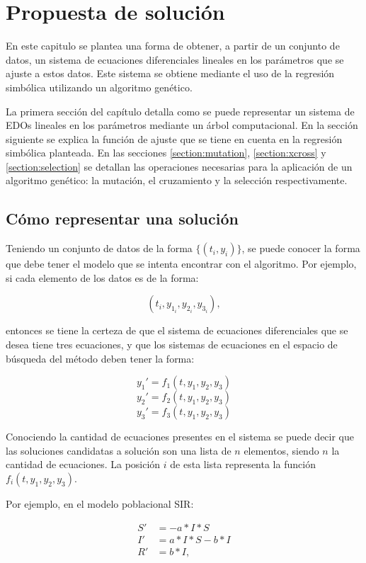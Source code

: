 \chapter{Propuesta de solución}\label{chapter:solution_proposal}

En este capitulo se plantea una forma de obtener, a partir de un conjunto de datos, un sistema de ecuaciones diferenciales lineales en los parámetros que se ajuste a estos datos. Este sistema se obtiene mediante el uso de la regresión simbólica utilizando un algoritmo genético.

La primera sección del capítulo detalla como se puede representar un sistema de EDOs lineales en los parámetros mediante un árbol computacional. En la sección siguiente se explica la función de ajuste que se tiene en cuenta en la regresión simbólica planteada. En las secciones \ref{section:mutation}, \ref{section:xcross} y \ref{section:selection} se detallan las operaciones necesarias para la aplicación de un algoritmo genético: la mutación, el cruzamiento y la selección respectivamente.

\section{Cómo representar una solución}

Teniendo un conjunto de datos de la forma $\{(t_i, y_i)\}$, se puede conocer la forma que debe tener el modelo que se intenta encontrar con el algoritmo. Por ejemplo, si cada elemento de los datos es de la forma:

$$(t_i, y_{1_i}, y_{2_i}, y_{3_i}),$$

entonces se tiene la certeza de que el sistema de ecuaciones diferenciales que se desea tiene tres ecuaciones, y que los sistemas de ecuaciones en el espacio de búsqueda del método deben tener la forma:

$$y_1' = f_1(t, y_1, y_2, y_3)$$
$$y_2' = f_2(t, y_1, y_2, y_3)$$
$$y_3' = f_3(t, y_1, y_2, y_3)$$

Conociendo la cantidad de ecuaciones presentes en el sistema se puede decir que las soluciones candidatas a solución son una lista de $n$ elementos, siendo $n$ la cantidad de ecuaciones. La posición $i$ de esta lista representa la función $f_i(t,y_1,y_2,y_3)$.

Por ejemplo, en el modelo poblacional SIR:

\begin{align*}
    S' & = - a*I*S     \\
    I' & = a*I*S - b*I \\
    R' & = b*I,
\end{align*}

